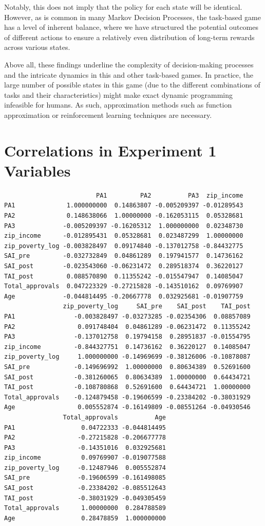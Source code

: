 \documentclass[
]{report}
\begin{document}
Notably, this does not imply that the policy for each state will be
identical. However, as is common in many Markov Decision Processes, the
task-based game has a level of inherent balance, where we have
structured the potential outcomes of different actions to ensure a
relatively even distribution of long-term rewards across various states.

Above all, these findings underline the complexity of decision-making
processes and the intricate dynamics in this and other task-based games.
In practice, the large number of possible states in this game (due to
the different combinations of tasks and their characteristics) might
make exact dynamic programming infeasible for humans. As such,
approximation methods such as function approximation or reinforcement
learning techniques are necessary.

\hypertarget{correlations-in-experiment-1-variables}{%
\section{Correlations in Experiment 1
Variables}\label{correlations-in-experiment-1-variables}}

\begin{verbatim}
                         PA1         PA2          PA3  zip_income
PA1              1.000000000  0.14863807 -0.005209397 -0.01289543
PA2              0.148638066  1.00000000 -0.162053115  0.05328681
PA3             -0.005209397 -0.16205312  1.000000000  0.02348730
zip_income      -0.012895431  0.05328681  0.023487299  1.00000000
zip_poverty_log -0.003828497  0.09174840 -0.137012758 -0.84432775
SAI_pre         -0.032732849  0.04861289  0.197941577  0.14736162
SAI_post        -0.023543060 -0.06231472  0.289518374  0.36220127
TAI_post         0.088570890  0.11355242 -0.015547947  0.14085047
Total_approvals  0.047223329 -0.27215828 -0.143510162  0.09769907
Age             -0.044814495 -0.20667778  0.032925681 -0.01907759
                zip_poverty_log     SAI_pre    SAI_post    TAI_post
PA1                -0.003828497 -0.03273285 -0.02354306  0.08857089
PA2                 0.091748404  0.04861289 -0.06231472  0.11355242
PA3                -0.137012758  0.19794158  0.28951837 -0.01554795
zip_income         -0.844327751  0.14736162  0.36220127  0.14085047
zip_poverty_log     1.000000000 -0.14969699 -0.38126006 -0.10878087
SAI_pre            -0.149696992  1.00000000  0.80634389  0.52691600
SAI_post           -0.381260065  0.80634389  1.00000000  0.64434721
TAI_post           -0.108780868  0.52691600  0.64434721  1.00000000
Total_approvals    -0.124879458 -0.19606599 -0.23384202 -0.38031929
Age                 0.005552874 -0.16149809 -0.08551264 -0.04930546
                Total_approvals          Age
PA1                  0.04722333 -0.044814495
PA2                 -0.27215828 -0.206677778
PA3                 -0.14351016  0.032925681
zip_income           0.09769907 -0.019077588
zip_poverty_log     -0.12487946  0.005552874
SAI_pre             -0.19606599 -0.161498085
SAI_post            -0.23384202 -0.085512643
TAI_post            -0.38031929 -0.049305459
Total_approvals      1.00000000  0.284788589
Age                  0.28478859  1.000000000
\end{verbatim}
\end{document}
